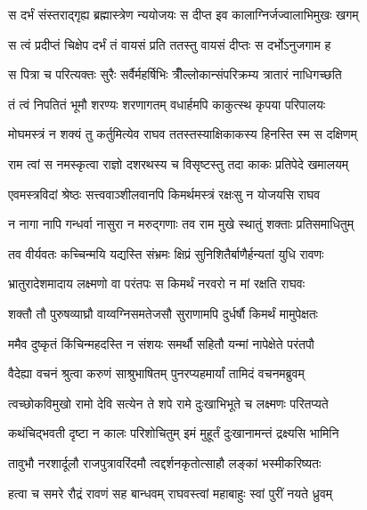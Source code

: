 \twolineshloka
{स दर्भं संस्तराद्गृह्य ब्रह्मास्त्रेण न्ययोजयः}
{स दीप्त इव कालाग्निर्जज्वालाभिमुखः खगम्} %

\twolineshloka
{स त्वं प्रदीप्तं चिक्षेप दर्भं तं वायसं प्रति}
{ततस्तु वायसं दीप्तः स दर्भोऽनुजगाम ह} %

\twolineshloka
{स पित्रा च परित्यक्तः सुरैः सर्वैर्महर्षिभिः}
{त्रीँल्लोकान्संपरिक्रम्य त्रातारं नाधिगच्छति} %

\twolineshloka
{तं त्वं निपतितं भूमौ शरण्यः शरणागतम्}
{वधार्हमपि काकुत्स्थ कृपया परिपालयः} %

\twolineshloka
{मोघमस्त्रं न शक्यं तु कर्तुमित्येव राघव}
{ततस्तस्याक्षिकाकस्य हिनस्ति स्म स दक्षिणम्} %

\twolineshloka
{राम त्वां स नमस्कृत्वा राज्ञो दशरथस्य च}
{विसृष्टस्तु तदा काकः प्रतिपेदे खमालयम्} %

\twolineshloka
{एवमस्त्रविदां श्रेष्ठः सत्त्ववाञ्शीलवानपि}
{किमर्थमस्त्रं रक्षःसु न योजयसि राघव} %

\twolineshloka
{न नागा नापि गन्धर्वा नासुरा न मरुद्गणाः}
{तव राम मुखे स्थातुं शक्ताः प्रतिसमाधितुम्} %

\twolineshloka
{तव वीर्यवतः कच्चिन्मयि यद्यस्ति संभ्रमः}
{क्षिप्रं सुनिशितैर्बाणैर्हन्यतां युधि रावणः} %

\twolineshloka
{भ्रातुरादेशमादाय लक्ष्मणो वा परंतपः}
{स किमर्थं नरवरो न मां रक्षति राघवः} %

\twolineshloka
{शक्तौ तौ पुरुषव्याघ्रौ वाय्वग्निसमतेजसौ}
{सुराणामपि दुर्धर्षौ किमर्थं मामुपेक्षतः} %

\twolineshloka
{ममैव दुष्कृतं किंचिन्महदस्ति न संशयः}
{समर्थौ सहितौ यन्मां नापेक्षेते परंतपौ} %

\twolineshloka
{वैदेह्या वचनं श्रुत्वा करुणं साश्रुभाषितम्}
{पुनरप्यहमार्यां तामिदं वचनमब्रुवम्} %

\twolineshloka
{त्वच्छोकविमुखो रामो देवि सत्येन ते शपे}
{रामे दुःखाभिभूते च लक्ष्मणः परितप्यते} %

\twolineshloka
{कथंचिद्भवती दृष्टा न कालः परिशोचितुम्}
{इमं मुहूर्तं दुःखानामन्तं द्रक्ष्यसि भामिनि} %

\twolineshloka
{तावुभौ नरशार्दूलौ राजपुत्रावरिंदमौ}
{त्वद्दर्शनकृतोत्साहौ लङ्कां भस्मीकरिष्यतः} %

\twolineshloka
{हत्वा च समरे रौद्रं रावणं सह बान्धवम्}
{राघवस्त्वां महाबाहुः स्वां पुरीं नयते ध्रुवम्} %

